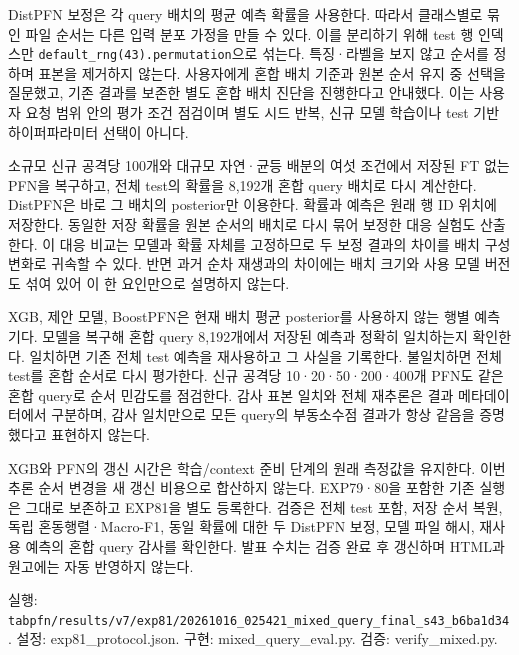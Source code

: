 DistPFN 보정은 각 query 배치의 평균 예측 확률을 사용한다. 따라서 클래스별로 묶인 파일 순서는 다른 입력 분포 가정을 만들 수 있다. 이를 분리하기 위해 test 행 인덱스만 \texttt{default\_\allowbreak{}\allowbreak{}rng(43).\allowbreak{}permutat\allowbreak{}ion}으로 섞는다. 특징·라벨을 보지 않고 순서를 정하며 표본을 제거하지 않는다. 사용자에게 혼합 배치 기준과 원본 순서 유지 중 선택을 질문했고, 기존 결과를 보존한 별도 혼합 배치 진단을 진행한다고 안내했다. 이는 사용자 요청 범위 안의 평가 조건 점검이며 별도 시드 반복, 신규 모델 학습이나 test 기반 하이퍼파라미터 선택이 아니다.

소규모 신규 공격당 100개와 대규모 자연·균등 배분의 여섯 조건에서 저장된 FT 없는 PFN을 복구하고, 전체 test의 확률을 8,192개 혼합 query 배치로 다시 계산한다. DistPFN은 바로 그 배치의 posterior만 이용한다. 확률과 예측은 원래 행 ID 위치에 저장한다. 동일한 저장 확률을 원본 순서의 배치로 다시 묶어 보정한 대응 실험도 산출한다. 이 대응 비교는 모델과 확률 자체를 고정하므로 두 보정 결과의 차이를 배치 구성 변화로 귀속할 수 있다. 반면 과거 순차 재생과의 차이에는 배치 크기와 사용 모델 버전도 섞여 있어 이 한 요인만으로 설명하지 않는다.

XGB, 제안 모델, BoostPFN은 현재 배치 평균 posterior를 사용하지 않는 행별 예측기다. 모델을 복구해 혼합 query 8,192개에서 저장된 예측과 정확히 일치하는지 확인한다. 일치하면 기존 전체 test 예측을 재사용하고 그 사실을 기록한다. 불일치하면 전체 test를 혼합 순서로 다시 평가한다. 신규 공격당 10·20·50·200·400개 PFN도 같은 혼합 query로 순서 민감도를 점검한다. 감사 표본 일치와 전체 재추론은 결과 메타데이터에서 구분하며, 감사 일치만으로 모든 query의 부동소수점 결과가 항상 같음을 증명했다고 표현하지 않는다.

XGB와 PFN의 갱신 시간은 학습/\allowbreak{}context 준비 단계의 원래 측정값을 유지한다. 이번 추론 순서 변경을 새 갱신 비용으로 합산하지 않는다. EXP79·80을 포함한 기존 실행은 그대로 보존하고 EXP81을 별도 등록한다. 검증은 전체 test 포함, 저장 순서 복원, 독립 혼동행렬·Macro-F1, 동일 확률에 대한 두 DistPFN 보정, 모델 파일 해시, 재사용 예측의 혼합 query 감사를 확인한다. 발표 수치는 검증 완료 후 갱신하며 HTML과 원고에는 자동 반영하지 않는다.

실행: \texttt{tabpfn/\allowbreak{}\allowbreak{}r\allowbreak{}esults/\allowbreak{}\allowbreak{}v\allowbreak{}7/\allowbreak{}\allowbreak{}exp81/\allowbreak{}\allowbreak{}20261016\allowbreak{}\_\allowbreak{}\allowbreak{}025421\_\allowbreak{}\allowbreak{}mixed\_\allowbreak{}\allowbreak{}qu\allowbreak{}ery\_\allowbreak{}\allowbreak{}fina\allowbreak{}l\_\allowbreak{}\allowbreak{}s43\_\allowbreak{}\allowbreak{}b6\allowbreak{}ba1d34}. 설정: exp81\_\allowbreak{}protocol.json. 구현: mixed\_\allowbreak{}query\_\allowbreak{}eval.py. 검증: verify\_\allowbreak{}mixed.py.



